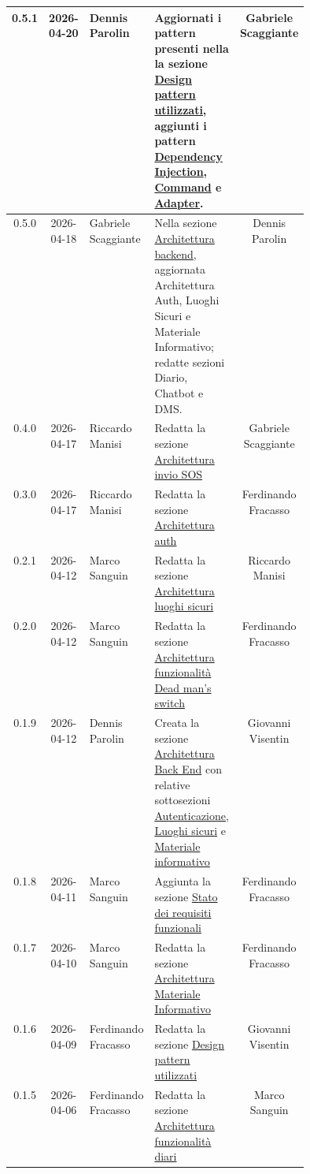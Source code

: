 \documentclass[a4paper,12pt]{article}
\begin{document}
\begin{center}
\begin{longtable}{|c|c|>{\raggedright\arraybackslash}p{0.21\linewidth}|>{\raggedright\arraybackslash}p{0.23\linewidth}|c|}
\hline
0.5.1 & 2026-04-20 & Dennis Parolin & Aggiornati i pattern presenti nella la sezione \hyperref[subsec:design_pattern]{Design pattern utilizzati}, aggiunti i pattern \hyperref[sec:pattern_dependency_injection]{Dependency Injection}, \hyperref[sec:pattern_command]{Command} e \hyperref[sec:pattern_adapter]{Adapter}. & Gabriele Scaggiante \\
\hline
0.5.0 & 2026-04-18 & Gabriele Scaggiante & Nella sezione \hyperref[subsec:architettura_backend]{Architettura backend}, aggiornata Architettura Auth, Luoghi Sicuri e Materiale Informativo; redatte sezioni Diario, Chatbot e DMS. & Dennis Parolin \\
\hline
0.4.0 & 2026-04-17 & Riccardo Manisi & Redatta la sezione \hyperref[subsubsec:architettura_dms]{Architettura invio SOS} & Gabriele Scaggiante \\
\hline
0.3.0 & 2026-04-17 & Riccardo Manisi & Redatta la sezione \hyperref[subsubsec:diagrammi_classi_auth]{Architettura auth} & Ferdinando Fracasso \\
\hline
0.2.1 & 2026-04-12 & Marco Sanguin & Redatta la sezione \hyperref[subsubsec:architettura_luoghi_sicuri]{Architettura luoghi sicuri} & Riccardo Manisi \\
\hline
0.2.0 & 2026-04-12 & Marco Sanguin & Redatta la sezione \hyperref[subsubsec:architettura_dead_man_switch]{Architettura funzionalità Dead man's switch} & Ferdinando Fracasso \\
\hline
0.1.9 & 2026-04-12 & Dennis Parolin & Creata la sezione \hyperref[subsec:architettura_backend]{Architettura Back End} con relative sottosezioni \hyperref[subsubsec:architettura_autenticazione]{Autenticazione}, \hyperref[subsubsec:architettura_luoghi_sicuri]{Luoghi sicuri} e \hyperref[subsubsec:architettura_materiale_informativo]{Materiale informativo} & Giovanni Visentin\\
\hline
0.1.8 & 2026-04-11 & Marco Sanguin & Aggiunta la sezione \hyperref[sec:stato_requisiti_funzionali]{Stato dei requisiti funzionali} & Ferdinando Fracasso\\
\hline
0.1.7 & 2026-04-10 & Marco Sanguin & Redatta la sezione \hyperref[subsubsec:architettura_materiale_informativo_frontend]{Architettura Materiale Informativo} & Ferdinando Fracasso \\
\hline
0.1.6 & 2026-04-09 & Ferdinando Fracasso & Redatta la sezione \hyperref[subsec:design_pattern]{Design pattern utilizzati} & Giovanni Visentin\\
\hline
0.1.5 & 2026-04-06 & Ferdinando Fracasso & Redatta la sezione \hyperref[subsubsec:architettura_diari_frontend]{Architettura funzionalità diari} & Marco Sanguin \\

\end{longtable}
\end{center}
\end{document}
